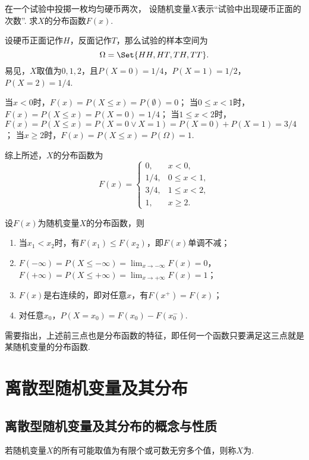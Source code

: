 \begin{example}
在一个试验中投掷一枚均匀硬币两次，
设随机变量\(X\)表示“试验中出现硬币正面的次数”.
求\(X\)的分布函数\(F(x)\).
\begin{solution}
设硬币正面记作\(H\)，反面记作\(T\)，那么试验的样本空间为\[
	\Omega = \Set{ HH, HT, TH, TT }.
\]
易见，\(X\)取值为\(0,1,2\)，且\(P(X=0) = 1/4\)，\(P(X=1) = 1/2\)，\(P(X=2) = 1/4\).

当\(x < 0\)时，\(F(x) = P(X \leq x) = P(\emptyset) = 0\)；
当\(0 \leq x < 1\)时，\(F(x) = P(X \leq x) = P(X=0) = 1/4\)；
当\(1 \leq x < 2\)时，\(F(x) = P(X \leq x) = P(X=0 \lor X=1) = P(X=0)+P(X=1) = 3/4\)；
当\(x \geq 2\)时，\(F(x) = P(X \leq x) = P(\Omega) = 1\).

综上所述，\(X\)的分布函数为\[
	F(x) = \left\{ \begin{array}{cl}
		0, & x < 0, \\
		1/4, & 0 \leq x < 1, \\
		3/4, & 1 \leq x < 2, \\
		1, & x \geq 2.
	\end{array} \right.
\]
\end{solution}
\end{example}

\begin{property}
设\(F(x)\)为随机变量\(X\)的分布函数，则
\begin{enumerate}
	\item 当\(x_1 < x_2\)时，有\(F(x_1) \leq F(x_2)\)，即\(F(x)\)单调不减；
	\item \(F(-\infty)=P(X \leq -\infty) = \lim_{x \to -\infty}{F(x)} = 0\)，
	\(F(+\infty)=P(X \leq +\infty) = \lim_{x \to +\infty}{F(x)} = 1\)；
	\item \(F(x)\)是右连续的，即对任意\(x\)，有\(F(x^+)=F(x)\)；
	\item 对任意\(x_0\)，\(P(X=x_0)=F(x_0)-F(x_0^-)\).
\end{enumerate}
\end{property}
需要指出，上述前三点也是分布函数的特征，即任何一个函数只要满足这三点就是某随机变量的分布函数.

\section{离散型随机变量及其分布}
\subsection{离散型随机变量及其分布的概念与性质}
\begin{definition}
若随机变量\(X\)的所有可能取值为有限个或可数无穷多个值，则称\(X\)为.
\end{definition}

